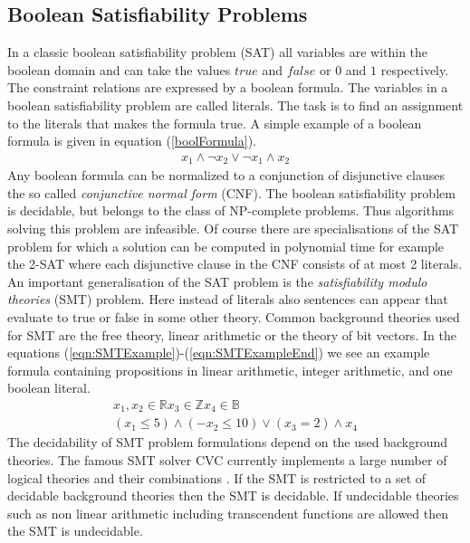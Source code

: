 \subsection{Boolean Satisfiability Problems}
\label{sec:MathBooleanSat}
In a classic boolean satisfiability problem (SAT) all variables are within the boolean domain and can take the values $true$ and $false$ or $0$ and $1$ respectively. The constraint relations are expressed by a boolean formula. The variables in a boolean satisfiability problem are called literals. The task is to find an assignment to the literals that makes the formula true. A simple example of a boolean formula is given in equation (\ref{boolFormula}).
\begin{eqnarray}
x_1 \land \neg x_2  \lor \neg x_1 \land {x_2}
\label{boolFormula}
\end{eqnarray}
Any boolean formula can be normalized to a conjunction of disjunctive clauses the so called \emph{conjunctive normal form} (CNF). The boolean satisfiability problem is decidable, but belongs to the class of NP-complete problems. Thus algorithms solving this problem are infeasible. Of course there are specialisations of the SAT problem for which a solution can be computed in polynomial time for example the 2-SAT where each disjunctive clause in the CNF consists of at most 2 literals. \\
An important generalisation of the SAT problem is the \emph{satisfiability modulo theories} (SMT) problem. Here instead of literals also sentences can appear that evaluate to true or false in some other theory. Common background theories used for SMT are the free theory, linear arithmetic or the theory of bit vectors. In the equations (\ref{eqn:SMTExample})-(\ref{eqn:SMTExampleEnd}) we see an example formula containing propositions in linear arithmetic, integer arithmetic, and one boolean literal.
\begin{eqnarray}
\label{eqn:SMTExample}
x_1,x_2\in \mathbb{R} x_3 \in \mathbb{Z} x_4\in \mathbb{B}\\
\label{eqn:SMTExampleEnd}
(x_1\leq 5) \land (-x_2\leq 10) \lor (x_3=2) \land x_4
\end{eqnarray}
The decidability of SMT problem formulations depend on the used background theories. The famous SMT solver CVC currently implements a large number of logical theories and their combinations \cite{cvc}. If the SMT is restricted to a set of decidable background theories then the SMT is decidable. If undecidable theories such as non linear arithmetic including transcendent functions are allowed then the SMT is undecidable.

